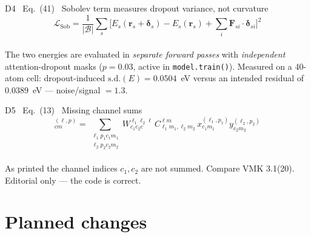 \documentclass[10pt,a4paper]{article}
\newcommand{\BAD}[1]{\textcolor{BADred}{#1}}
\newcommand{\NEW}[1]{\textcolor{NEWblue}{#1}}
\newcommand{\rr}{\bm{r}}
\newcommand{\code}[1]{\texttt{\small #1}}
\begin{document}
\begin{badbox}{D4 \ Eq.~(41) \ Sobolev term measures dropout variance, not curvature}
\vspace{-6pt}
\begin{equation*}
\mathcal L_{\mathrm{Sob}} = \frac1{|\mathcal B|}\sum_{s}\Big[E_s(\rr_s+\bm\delta_s)-E_s(\rr_s)
+\sum_i \bm F_{si}\!\cdot\!\bm\delta_{si}\Big]^2
\end{equation*}
\vspace{-8pt}\\
\footnotesize
The two energies are evaluated in \emph{separate forward passes} with \emph{independent}
attention-dropout masks ($p=0.03$, active in \code{model.train()}).
Measured on a 40-atom cell: dropout-induced $\mathrm{s.d.}(E) = 0.0504$~eV versus an
intended residual of $0.0389$~eV --- \BAD{noise/signal $=1.3$}.
\end{badbox}

\begin{badbox}{D5 \ Eq.~(13) \ Missing channel sums}
\vspace{-6pt}
\begin{equation*}
[\bm x\otimes_{\mathrm{CG}}\bm y]^{(\ell,p)}_{cm}
= \sum_{\substack{\ell_1p_1c_1m_1\\ \ell_2p_2c_2m_2}}
W^{\ell_1\ell_2\ell}_{c_1c_2c}\,C^{\ell m}_{\ell_1m_1,\ell_2m_2}\,
x^{(\ell_1,p_1)}_{c_1m_1}y^{(\ell_2,p_2)}_{c_2m_2}
\end{equation*}
\vspace{-8pt}\\
\footnotesize As printed the channel indices $c_1,c_2$ are not summed. Compare VMK 3.1(20).
Editorial only --- the code is correct.
\end{badbox}

\section{\NEW{Planned changes}}
\end{document}
